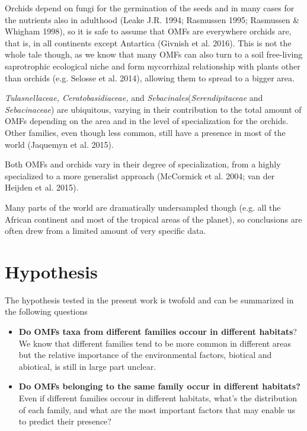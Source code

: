 Orchids depend on fungi for the germination of the seeds and in many cases for the nutrients also in adulthood (Leake J.R. 1994; Rasmussen 1995; Rasmussen \& Whigham 1998), so it is safe to assume that OMFs are everywhere orchids are, that is, in all continents except Antartica (Givnish et al. 2016). This is not the whole tale though, as we know that many OMFs can also turn to a soil free-living saprotrophic ecological niche and form mycorrhizal relationship with plants other than orchids (e.g. Selosse et al. 2014), allowing them to spread to a bigger area.

\emph{Tulasnellaceae, Ceratobasidiaceae,} and \emph{Sebacinales}(\emph{Serendipitaceae} and \emph{Sebacinaceae}) are ubiquitous, varying in their contribution to the total amount of OMFs depending on the area and in the level of specialization for the orchids.
Other families, even though less common, still have a presence in most of the world (Jaquemyn et al. 2015).

Both OMFs and orchids vary in their degree of specialization, from a highly specialized to a more generalist approach (McCormick et al. 2004; van der Heijden et al. 2015).

Many parts of the world are dramatically undersampled though (e.g. all the African continent and most of the tropical areas of the planet), so conclusions are often drew from a limited amount of very specific data.

\chapter{Hypothesis}
\label{hypothesis}

The hypothesis tested in the present work is twofold and can be summarized in the following questions

\begin{itemize}
\item \textbf{Do OMFs taxa from different families occour in different habitats}? We know that different families tend to be more common in different areas but the relative importance of the environmental factors, biotical and abiotical, is still in large part unclear.

\item \textbf{Do OMFs belonging to the same family occur in different habitats?} Even if different families occour in different habitats, what's the distribution of each family, and what are the most important factors that may enable us to predict their presence?

\end{itemize}

